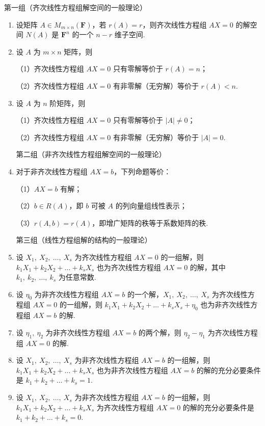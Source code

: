 第一组（齐次线性方程组解空间的一般理论）
\begin{enumerate}
	\item 设矩阵 $A \in M_{m\times n}(\mathbf{F})$，若 $r(A)=r$，则齐次线性方程组 $AX=0$ 的解空间 $N(A)$ 是 $\mathbf{F}^n$ 的一个 $n-r$ 维子空间.
	
	\item 设 $A$ 为 $m \times n$ 矩阵，则

		（1）齐次线性方程组 $AX=0$ 只有零解等价于 $r(A)=n$；
		
		（2）齐次线性方程组 $AX=0$ 有非零解（无穷解）等价于 $r(A)<n$.
	
	\item 设 $A$ 为 $n$ 阶矩阵，则

		（1）齐次线性方程组 $AX=0$ 只有零解等价于 $|A|\neq 0$；

		（2）齐次线性方程组 $AX=0$ 有非零解（无穷解）等价于 $|A|=0$.
	
	第二组（非齐次线性方程组解空间的一般理论）
	
	\item 对于非齐次线性方程组 $AX=b$，下列命题等价：
		
		（1）$AX=b$ 有解；
		
		（2）$b \in R(A)$，即 $b$ 可被 $A$ 的列向量组线性表示；
		
		（3）$r(A,b)=r(A)$，即增广矩阵的秩等于系数矩阵的秩.
	
	第三组（线性方程组解的结构的一般理论）
	
	\item 设 $X_1,\ X_2,\ \dots,\ X_s$ 为齐次线性方程组 $AX=0$ 的一组解，则 $k_1X_1+k_2X_2+\dots+k_sX_s$ 也为齐次线性方程组 $AX=0$ 的解，其中 $k_1,\ k_2,\ \dots,\ k_s$ 为任意常数.
	
	\item 设 $\eta_0$ 为非齐次线性方程组 $AX=b$ 的一个解，$X_1,\ X_2,\ \dots,\ X_s$ 为齐次线性方程组 $AX=0$ 的一组解，则 $k_1X_1+k_2X_2+\dots+k_sX_s+\eta_0$ 也为非齐次线性方程组 $AX=b$ 的解.
	
	\item 设 $\eta_1,\ \eta_2$ 为非齐次线性方程组 $AX=b$ 的两个解，则 $\eta_2-\eta_1$ 为齐次线性方程组 $AX=0$ 的解.
	
	\item 设 $X_1,\ X_2,\ \dots,\ X_s$ 为非齐次线性方程组 $AX=b$ 的一组解，则 $k_1X_1+k_2X_2+\dots+k_sX_s$ 也为非齐次线性方程组 $AX=b$ 的解的充分必要条件是 $k_1+k_2+\dots+k_s=1$.
	
	\item 设 $X_1,\ X_2,\ \dots,\ X_s$ 为非齐次线性方程组 $AX=b$ 的一组解，则 $k_1X_1+k_2X_2+\dots+k_sX_s$ 为齐次线性方程组 $AX=0$ 的解的充分必要条件是 $k_1+k_2+\dots+k_s=0$.
	

\end{enumerate}
